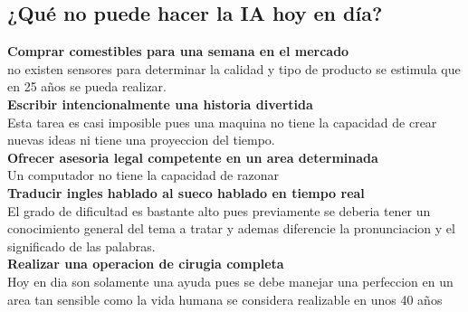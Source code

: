 \documentclass[12pt,a4paper]{report}
\begin{document}
\subsection*{¿Qué no puede hacer la IA hoy en día?}
\textbf{Comprar comestibles para una semana en el mercado}\\
no existen sensores para determinar la calidad y tipo de producto se estimula que en 25 años se pueda realizar.
\\\textbf{Escribir intencionalmente una historia divertida}\\Esta tarea es casi imposible pues una maquina no tiene la capacidad de crear nuevas ideas ni tiene una proyeccion del tiempo.
\\\textbf{Ofrecer asesoria legal competente en un area determinada}\\Un computador no tiene la capacidad de razonar
\\\textbf{Traducir ingles hablado al sueco hablado en tiempo real}\\El grado de dificultad es bastante alto pues previamente se deberia tener un conocimiento general del tema a tratar y ademas diferencie la pronunciacion y el significado de las palabras.
\\\textbf{Realizar una operacion de cirugia completa}\\Hoy en dia son solamente una ayuda pues se debe manejar una perfeccion en un area tan sensible como la vida humana se considera realizable en unos 40 años
\end{document}

